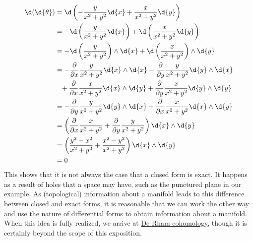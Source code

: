 \documentclass[a4paper,12pt]{article}
\begin{document}
\begin{align*}
    \d(\d{\theta}) &= \d\left(-\frac{y}{x^2 + y^2} \d{x} + \frac{x}{x^2 + y^2} \d{y}\right) \\
    &= -\d\left(\frac{y}{x^2 + y^2} \d{x}\right) + \d\left(\frac{x}{x^2 + y^2} \d{y}\right) \\
    &= -\d\left(\frac{y}{x^2 + y^2}\right) \wedge \d{x} + \d\left(\frac{x}{x^2 + y^2}\right) \wedge\d{y} \\
    &= -\frac{\partial}{\partial x} \frac{y}{x^2 + y^2}\d{x} \wedge \d{x} -\frac{\partial}{\partial y} \frac{y}{x^2 + y^2} \d{y} \wedge \d{x} \\
    &\phantom{=} + \frac{\partial}{\partial x}\frac{x}{x^2 + y^2} \d{x} \wedge \d{y} + \frac{\partial}{\partial y}\frac{x}{x^2 + y^2} \d{y} \wedge \d{y} \\
    &= -\frac{\partial}{\partial y} \frac{y}{x^2 + y^2} \d{y} \wedge \d{x} + \frac{\partial}{\partial x}\frac{x}{x^2 + y^2} \d{x} \wedge \d{y} \\
    &= \left(\frac{\partial}{\partial x}\frac{x}{x^2 + y^2} + \frac{\partial}{\partial y} \frac{y}{x^2 + y^2} \right) \d{x} \wedge \d{y} \\
    &= \left(\frac{y^2 - x^2}{x^2 + y^2} + \frac{x^2 - y^2}{x^2 + y^2}\right) \d{x} \wedge \d{y} \\
    &= 0
\end{align*}
This shows that it is not always the case that a closed form is exact.
It happens as a result of holes that a space may have, such as the punctured plane in our example.
As (topological) information about a manifold leads to this difference between closed and exact forms, it is reasonable that we can work the other way and use the nature of differential forms to obtain information about a manifold.
When this idea is fully realized, we arrive at \href{https://en.wikipedia.org/wiki/De_Rham_cohomology}{De Rham cohomology}, though it is certainly beyond the scope of this exposition.
\end{document}
